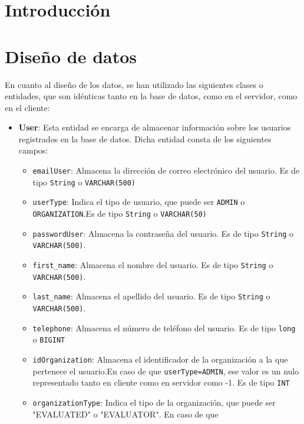 
\section{Introducción}

\section{Diseño de datos}
En cuanto al diseño de los datos, se han utilizado las siguientes clases o entidades, que son idénticas tanto en la base de datos, como en el servidor, como en el cliente:
\begin{itemize}
    
    \item \textbf{User}: Esta entidad se encarga de almacenar información sobre los usuarios registrados en la base de datos. Dicha entidad consta de los siguientes campos:
    \begin{itemize}
        \item \texttt{emailUser}: Almacena la dirección de correo electrónico del usuario. Es de tipo \texttt{String} o \texttt{VARCHAR(500)}
        \item \texttt{userType}: Indica el tipo de usuario, que puede ser \texttt{ADMIN} o \texttt{ORGANIZATION}.Es de tipo \texttt{String} o \texttt{VARCHAR(50)}
        \item \texttt{passwordUser}: Almacena la contraseña del usuario. Es de tipo \texttt{String} o \texttt{VARCHAR(500)}.
        \item \texttt{first\_name}: Almacena el nombre del usuario. Es de tipo \texttt{String} o \texttt{VARCHAR(500)}.
        \item \texttt{last\_name}: Almacena el apellido del usuario. Es de tipo \texttt{String} o \texttt{VARCHAR(500)}.
        \item \texttt{telephone}: Almacena el número de teléfono del usuario. Es de tipo \texttt{long} o \texttt{BIGINT}
        \item \texttt{idOrganization}: Almacena el identificador de la organización a la
        que pertenece el usuario.En caso de que
        \texttt{userType=ADMIN}, ese valor es un nulo representado tanto en
        cliente como en servidor como -1. Es de tipo \texttt{INT}
        \item \texttt{organizationType}: Indica el tipo de la organización, que
        puede ser "EVALUATED" o "EVALUATOR". En caso de que

\end{itemize}
\end{itemize}
